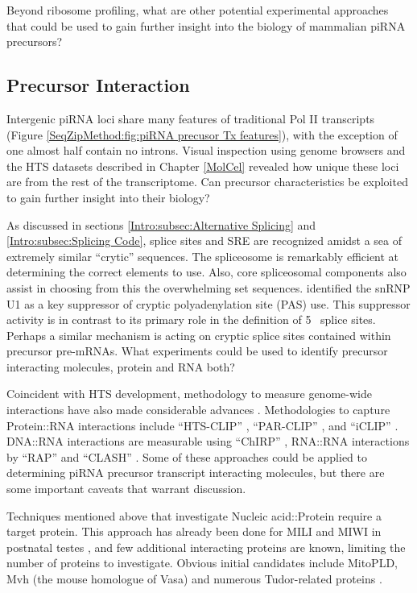     Beyond ribosome profiling, what are other potential experimental approaches that could be used to gain further insight into the biology of mammalian piRNA precursors?

  \subsection{Precursor Interaction}
    \label{Disc:subsec:Labeling of precursors}

      Intergenic piRNA loci share many features of traditional Pol II transcripts (Figure \ref{SeqZipMethod:fig:piRNA precusor Tx features}), with the exception of one almost half contain no introns. Visual inspection using genome browsers and the HTS datasets described in Chapter \ref{MolCel} revealed how unique these loci are from the rest of the transcriptome. Can precursor characteristics be exploited to gain further insight into their biology?

      As discussed in sections \ref{Intro:subsec:Alternative Splicing} and \ref{Intro:subsec:Splicing Code}, splice sites and SRE are recognized amidst a sea of extremely similar ``crytic'' sequences. The spliceosome is remarkably efficient at determining the correct elements to use. Also, core spliceosomal components also assist in choosing from this the overwhelming set sequences. \citet{Berg2012} identified the snRNP U1 as a key suppressor of cryptic polyadenylation site (PAS) use. This suppressor activity is in contrast to its primary role in the definition of 5\textprime~ splice sites. Perhaps a similar mechanism is acting on cryptic splice sites contained within precursor pre-mRNAs. What experiments could be used to identify precursor interacting molecules, protein and RNA both?

      Coincident with HTS development, methodology to measure genome-wide interactions have also made considerable advances \citep{Konig2011}. Methodologies to capture Protein::RNA interactions include ``HTS-CLIP'' \citep{Licatalosi2008}, ``PAR-CLIP'' \citep{Hafner2010}, and ``iCLIP'' \citep{Konig2010}. DNA::RNA interactions are measurable using ``ChIRP'' \citep{Chu2012}, RNA::RNA interactions by ``RAP'' and ``CLASH'' \citep{Engreitz2013,Helwak2014}. Some of these approaches could be applied to determining piRNA precursor transcript interacting molecules, but there are some important caveats that warrant discussion.

      Techniques mentioned above that investigate Nucleic acid::Protein require a target protein. This approach has already been done for MILI and MIWI in postnatal testes \citep{Vourekas2012}, and few additional interacting proteins are known, limiting the number of proteins to investigate. Obvious initial candidates include MitoPLD, Mvh \citep{Lasko2013} (the mouse homologue of Vasa) and numerous Tudor-related proteins \citep{Chen2011}.

